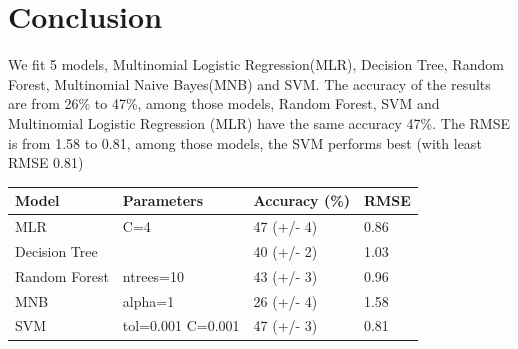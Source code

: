 \documentclass{article}
\begin{document}
\section{Conclusion}
We fit 5 models, Multinomial Logistic Regression(MLR), Decision Tree, Random Forest, Multinomial Naive Bayes(MNB) and SVM. The accuracy of the results are from 26\% to 47\%, among those models, Random Forest, SVM and Multinomial Logistic Regression (MLR) have the same accuracy 47\%. The RMSE is from 1.58 to 0.81, among those models, the SVM performs best (with least RMSE 0.81)
\begin{center}
    \begin{tabular}{| l | l | l | l |}
    \hline
    Model & Parameters & Accuracy (\%) & RMSE \\ \hline
	MLR &  C=4 & 47 (+/- 4) & 0.86\\ \hline
    Decision Tree & & 40 (+/- 2) &1.03 \\ \hline
    Random Forest & ntrees=10& 43 (+/- 3) & 0.96\\ \hline
    MNB & alpha=1& 26 (+/- 4)&1.58 \\ \hline
	SVM & tol=0.001 C=0.001& 47 (+/- 3) & 0.81\\ \hline
    \end{tabular}
\end{center}
\end{document}
